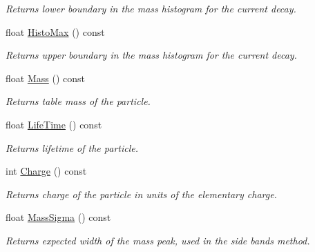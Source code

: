 \begin{DoxyCompactItemize}
\begin{DoxyCompactList}\small\item\em Returns lower boundary in the mass histogram for the current decay. \end{DoxyCompactList}\item 
float \hyperlink{classKFEfficiencyParticleInfo_aee222cb7840e42c559ee4355b5eaf758}{Histo\+Max} () const \hypertarget{classKFEfficiencyParticleInfo_aee222cb7840e42c559ee4355b5eaf758}{}\label{classKFEfficiencyParticleInfo_aee222cb7840e42c559ee4355b5eaf758}

\begin{DoxyCompactList}\small\item\em Returns upper boundary in the mass histogram for the current decay. \end{DoxyCompactList}\item 
float \hyperlink{classKFEfficiencyParticleInfo_a89d8bf25bd33ac18f59e91c442c5b203}{Mass} () const \hypertarget{classKFEfficiencyParticleInfo_a89d8bf25bd33ac18f59e91c442c5b203}{}\label{classKFEfficiencyParticleInfo_a89d8bf25bd33ac18f59e91c442c5b203}

\begin{DoxyCompactList}\small\item\em Returns table mass of the particle. \end{DoxyCompactList}\item 
float \hyperlink{classKFEfficiencyParticleInfo_ae9876ae7a99238a95f626da9eb6c4b83}{Life\+Time} () const \hypertarget{classKFEfficiencyParticleInfo_ae9876ae7a99238a95f626da9eb6c4b83}{}\label{classKFEfficiencyParticleInfo_ae9876ae7a99238a95f626da9eb6c4b83}

\begin{DoxyCompactList}\small\item\em Returns lifetime of the particle. \end{DoxyCompactList}\item 
int \hyperlink{classKFEfficiencyParticleInfo_a9356a85bc4c1a0c13c906c909aa9d8af}{Charge} () const \hypertarget{classKFEfficiencyParticleInfo_a9356a85bc4c1a0c13c906c909aa9d8af}{}\label{classKFEfficiencyParticleInfo_a9356a85bc4c1a0c13c906c909aa9d8af}

\begin{DoxyCompactList}\small\item\em Returns charge of the particle in units of the elementary charge. \end{DoxyCompactList}\item 
float \hyperlink{classKFEfficiencyParticleInfo_af0c07beebc5c92c6836fae18f8df103b}{Mass\+Sigma} () const \hypertarget{classKFEfficiencyParticleInfo_af0c07beebc5c92c6836fae18f8df103b}{}\label{classKFEfficiencyParticleInfo_af0c07beebc5c92c6836fae18f8df103b}

\begin{DoxyCompactList}\small\item\em Returns expected width of the mass peak, used in the side bands method. \end{DoxyCompactList}\end{DoxyCompactItemize}


